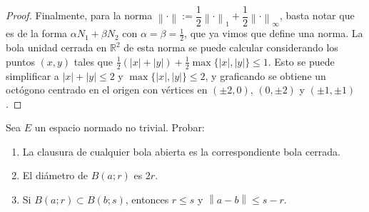 \documentclass{article}
\theoremstyle{definition}
\newcommand{\R}{\mathbb{R}}
\newcommand{\norm}[1]{\left\lVert #1 \right\rVert}       %
\newcommand{\bola}[2]{B(#1;#2)}                           %
\newenvironment{ejercicio}[1]{\begin{trivlist}
\item[\hskip \labelsep {\bfseries Ejercicio}\hskip \labelsep {\bfseries #1.}]}{\end{trivlist}}
\begin{document}
\begin{proof}
    Finalmente, para la norma \( \norm{\cdot}:=\dfrac{1}{2}\norm{\cdot}_1+\dfrac{1}{2}\norm{\cdot}_\infty \), basta notar que es de la forma \(\alpha N_1+\beta N_2\) con \(\alpha=\beta=\frac{1}{2}\), que ya vimos que define una norma.
    La bola unidad cerrada en \(\R^2\) de esta norma se puede calcular considerando los puntos \((x,y)\) tales que \(\frac{1}{2}(|x|+|y|) + \frac{1}{2} \max \{|x|,|y|\} \leq 1\). Esto se puede simplificar a \(|x|+|y| \leq 2\) y \( \max \{|x|,|y|\} \leq 2\), y graficando se obtiene un octógono centrado en el origen con vértices en \((\pm 2,0)\), \((0,\pm 2)\) y \((\pm 1,\pm 1)\).
\end{proof}

\vspace{0.5cm}

\begin{ejercicio}{9}
    Sea \(E\) un espacio normado no trivial. Probar: \begin{enumerate}
        \item La clausura de cualquier bola abierta es la correspondiente bola cerrada.
        \item El diámetro de \(\bola{a}{r}\) es \(2r\).
        \item Si \(\bola{a}{r}\subset\bola{b}{s}\), entonces \(r\leq s\) y \(\norm{a-b}\leq s-r\).
    \end{enumerate}
\end{ejercicio}
\end{document}
